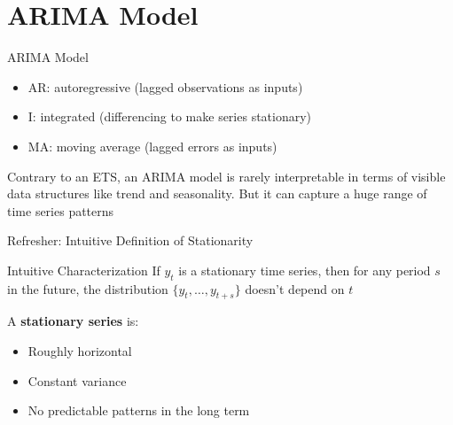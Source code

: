 \documentclass{beamer}
\begin{document}
\section{ARIMA Model}


\begin{frame}{ARIMA Model}

  \begin{itemize}
  \item AR: autoregressive (lagged observations as inputs)
  \item I: integrated (differencing to make series stationary)
  \item MA: moving average (lagged errors as inputs)
  \end{itemize}

  \begin{exampleblock}
    Contrary to an ETS, an ARIMA model is rarely interpretable in terms of visible data structures like trend and seasonality. But it can capture a huge range of time series patterns
  \end{exampleblock}  
\end{frame}


\begin{frame}{Refresher: Intuitive Definition of Stationarity}

  \begin{block}{Intuitive Characterization}
    If ${y_t}$ is a stationary time series, then for any period $s$ in the future, the distribution $\{y_t, \dots, y_{t+s}\}$ doesn't depend on $t$
  \end{block}

  A \textbf{stationary series} is:
  \begin{itemize}
  \item Roughly horizontal
  \item Constant variance
  \item No predictable patterns in the long term
  \end{itemize}
  
\end{frame}
\end{document}
